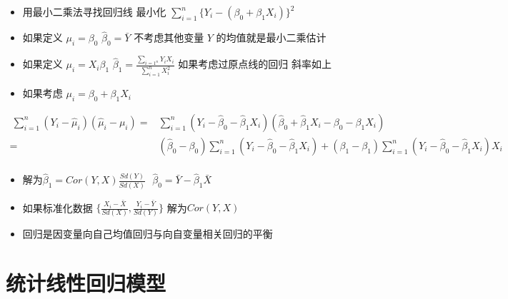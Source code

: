 \documentclass[
]{book}
\providecommand{\tightlist}{%
  \setlength{\itemsep}{0pt}\setlength{\parskip}{0pt}}
\begin{document}
\begin{itemize}
\tightlist
\item
  用最小二乘法寻找回归线 最小化 \(\sum_{i=1}^n \{Y_i - (\beta_0 + \beta_1 X_i)\}^2\)
\item
  如果定义 \(\mu_i = \beta_0\) \(\hat \beta_0 = \bar Y\) 不考虑其他变量 \(Y\) 的均值就是最小二乘估计
\item
  如果定义 \(\mu_i = X_i \beta_1\) \(\hat \beta_1 = \frac{\sum_{i=1^n} Y_i X_i}{\sum_{i=1}^n X_i^2}\) 如果考虑过原点线的回归 斜率如上
\item
  如果考虑 \(\mu_i = \beta_0 + \beta_1 X_i\)
\end{itemize}

\begin{align} \
\sum_{i=1}^n (Y_i - \hat \mu_i) (\hat \mu_i - \mu_i) 
= & \sum_{i=1}^n (Y_i - \hat\beta_0 - \hat\beta_1 X_i) (\hat \beta_0 + \hat \beta_1 X_i - \beta_0 - \beta_1 X_i) \\
= & (\hat \beta_0 - \beta_0) \sum_{i=1}^n (Y_i - \hat\beta_0 - \hat \beta_1 X_i) + (\beta_1 - \beta_1)\sum_{i=1}^n (Y_i - \hat\beta_0 - \hat \beta_1 X_i)X_i\\
\end{align}

\begin{itemize}
\tightlist
\item
  解为\(\hat \beta_1 = Cor(Y, X) \frac{Sd(Y)}{Sd(X)} ~~~ \hat \beta_0 = \bar Y - \hat \beta_1 \bar X\)
\item
  如果标准化数据 \(\{ \frac{X_i - \bar X}{Sd(X)}, \frac{Y_i - \bar Y}{Sd(Y)}\}\) 解为\(Cor(Y, X)\)
\item
  回归是因变量向自己均值回归与向自变量相关回归的平衡
\end{itemize}

\hypertarget{ux7edfux8ba1ux7ebfux6027ux56deux5f52ux6a21ux578b}{%
\section{统计线性回归模型}\label{ux7edfux8ba1ux7ebfux6027ux56deux5f52ux6a21ux578b}}
\end{document}
